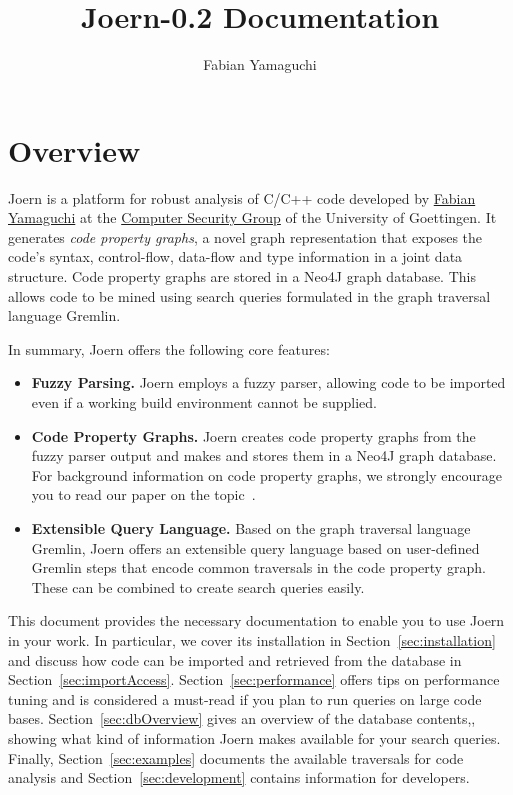 \documentclass[a4paper]{article}
\begin{document}
\title{Joern-0.2 Documentation}

\author{Fabian Yamaguchi}

\maketitle
\newpage
\tableofcontents
\newpage

\section{Overview}

Joern is a platform for robust analysis of C/C++ code developed by
\href{http://codeexploration.blogspot.de}{Fabian Yamaguchi} at the
\href{http://goesec.de}{Computer Security Group} of the University of
Goettingen. It generates \emph{code property graphs}, a novel graph
representation that exposes the code's syntax, control-flow, data-flow
and type information in a joint data structure. Code property graphs
are stored in a Neo4J graph database. This allows code to be mined
using search queries formulated in the graph traversal language
Gremlin.

In summary, Joern offers the following core features:

\begin{itemize}
  \item \textbf{Fuzzy Parsing.} Joern employs a fuzzy parser, allowing
    code to be imported even if a working build environment cannot be
    supplied.
    
  \item \textbf{Code Property Graphs.} Joern creates code property
    graphs from the fuzzy parser output and makes and stores them in a
    Neo4J graph database. For background information on code property
    graphs, we strongly encourage you to read our paper on the
    topic~\citep{YamGolArpRie14}.
    
  \item \textbf{Extensible Query Language.} Based on the graph
    traversal language Gremlin, Joern offers an extensible query language
    based on user-defined Gremlin steps that encode common traversals in
    the code property graph. These can be combined to create search
    queries easily.
    
\end{itemize}

This document provides the necessary documentation to enable you to
use Joern in your work. In particular, we cover its installation in
Section~\ref{sec:installation} and discuss how code can be imported
and retrieved from the database in
Section~\ref{sec:importAccess}. Section~\ref{sec:performance} offers
tips on performance tuning and is considered a must-read if you plan
to run queries on large code bases. Section~\ref{sec:dbOverview} gives
an overview of the database contents,, showing what kind of
information Joern makes available for your search queries. Finally,
Section~\ref{sec:examples} documents the available traversals for code
analysis and Section~\ref{sec:development} contains information for
developers.
\end{document}
